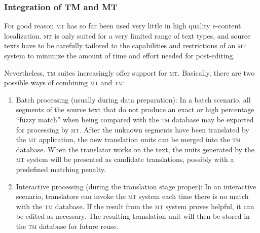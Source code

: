 \documentclass[output=paper]{LSP/langsci}
\begin{document}
\subsubsection{Integration of TM and MT}\label{sec:reinke:2.4.2}

For good reason \textsc{mt} has so far been used very little in high quality e-content localization. \textsc{mt} is only suited for a very limited range of text types, and source texts have to be carefully tailored to the capabilities and restrictions of an \textsc{mt} system to minimize the amount of time and effort needed for post-editing.

Nevertheless, \textsc{tm} suites increasingly offer support for \textsc{mt}. Basically, there are two possible ways of combining \textsc{mt} and \textsc{tm}:

\begin{enumerate}
\item 
Batch processing (usually during data preparation):
In a batch scenario, all segments of the source text that do not produce an exact or high percentage ``fuzzy match'' when being compared with the \textsc{tm} database may be exported for processing by \textsc{mt}. After the unknown segments have been translated by the \textsc{mt} application, the new translation units can be merged into the \textsc{tm} database. When the translator works on the text, the units generated by the \textsc{mt} system will be presented as candidate translations, possibly with a predefined matching penalty.
\item
Interactive processing (during the translation stage proper):
In an interactive scenario, translators can invoke the \textsc{mt} system each time there is no match with the \textsc{tm} database. If the result from the \textsc{mt} system proves helpful, it can be edited as necessary. The resulting translation unit will then be stored in the \textsc{tm} database for future reuse.
\end{enumerate}
\end{document}
